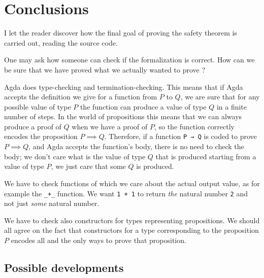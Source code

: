 \documentclass{article}
\begin{document}
\section{Conclusions}

I let the reader discover how the final goal of proving the safety theorem is carried out, reading the source code.

One may ask how someone can check if the formalization is correct.
How can we be sure that we have proved what we actually wanted to prove ?

Agda does type-checking and termination-checking.
This means that if Agda accepts the definition we give for a function from $P$ to $Q$, we are sure that for any possible value of type $P$ the function can produce a value of type $Q$ in a finite number of steps.
In the world of propositions this means that we can always produce a proof of $Q$ when we have a proof of $P$, so the function correctly encodes the proposition $P \implies Q$.
Therefore, if a function \texttt{P → Q} is coded to prove $P \implies Q$, and Agda accepts the function's body, there is no need to check the body; we don't care what is the value of type $Q$ that is produced starting from a value of type $P$, we just care that some $Q$ is produced.

We have to check functions of which we care about the actual output value, as for example the \texttt{\_+\_} function.
We want \texttt{1 + 1} to return \textit{the} natural number \texttt{2} and not just \textit{some} natural number. 

We have to check also constructors for types representing propositions.
We should all agree on the fact that constructors for a type corresponding to the proposition $P$ encodes all and the only ways to prove that proposition.


\subsection{Possible developments}




\newpage
\nocite{*}
\printbibliography
\end{document}
